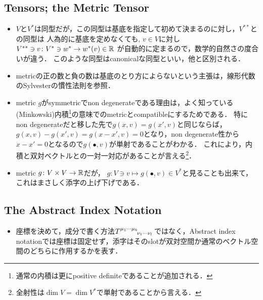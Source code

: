 \subsection{Tensors; the Metric Tensor}
\begin{itemize}
	\item $V$と$V^{*}$は同型だが，この同型は基底を指定して初めて決まるのに対し，$V^{**}$との同型は
		人為的に基底を定めなくても, $v\in V$に対し
		$V^{**}\ni v\colon V^{*}\ni w^{*}\to w^{*}(v)\in \mathbb{R}$
		が自動的に定まるので，数学的自然さの度合いが違う．
		このような同型はcanonicalな同型といい，他と区別される．
	\item metricの正の数と負の数は基底のとり方によらないという主張は，線形代数のSylvesterの慣性法則を参照．
	\item metric $g$がsymmetricでnon degenerateである理由は，よく知っている(Minkowski)内積\footnote{通常の内積は更にpositive definiteであることが追加される．}の意味でのmetricとcompatibleにするためである．
		特にnon degenerateだと移した先で$g(x, v) = g(x', v)$と同じならば，$g(x, v) - g(x', v) = g(x-x', v) = 0$となり，non degenerate性から$x-x'=0$となるので$g(\bullet, v)$が単射であることがわかる．
		これにより，内積と双対ベクトルとの一対一対応があることが言える\footnote{全射性は$\dim V = \dim V^{*}$で単射であることから言える．}．
	\item metric $g\colon V\times V \to \mathbb{R}$だが，
		$g\colon V\ni v\mapsto g(\bullet, v) \in V^{*}$と見ることも出来て，これはまさしく添字の上げ下げである．
\end{itemize}

\subsection{The Abstract Index Notation}
\begin{itemize}
	\item 座標を決めて，成分で書く方法$T\indices{^{\mu_1\cdots\mu_k}_{\nu_1\cdots\nu_l}}$ではなく，Abstract index notationでは座標は固定せず，添字はそのslotが双対空間か通常のベクトル空間のどちらに作用するかを表す．
\end{itemize}
